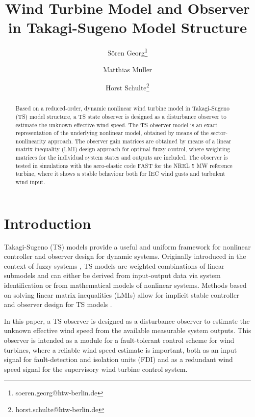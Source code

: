 \documentclass[a4paper]{article}
\title{Wind Turbine Model and Observer in Takagi-Sugeno Model Structure}
\date{}
\author[1]{S\"oren Georg\thanks{soeren.georg@htw-berlin.de}}
\author[1,2]{Matthias M\"uller}
\author[1]{Horst Schulte\thanks{horst.schulte@htw-berlin.de}}
\affil[1]{HTW Berlin, Department of Engineering I, Control Engineering, Berlin, Germany}
\affil[2]{Key Wind Energy GmbH, Berlin, Germany}
\begin{document}
\maketitle

\thispagestyle{fancy}

\begin{abstract}
Based on a reduced-order, dynamic nonlinear wind turbine model in Takagi-Sugeno (TS) model structure, a TS state observer is designed as a disturbance observer to estimate the unknown effective wind speed. The TS observer model is an exact representation of the underlying nonlinear model, obtained by means of the sector-nonlinearity approach. The observer gain matrices are obtained by means of a linear matrix inequality (LMI) design approach for optimal fuzzy control, where weighting matrices for the individual system states and outputs are included.
The observer is tested in simulations with the aero-elastic code FAST for the NREL 5 MW reference turbine, where it shows a stable behaviour both for IEC wind gusts and turbulent wind input.
\end{abstract}

\section{Introduction}

Takagi-Sugeno (TS) models provide a useful and uniform framework for nonlinear controller and observer design for dynamic systems. Originally introduced in the context of fuzzy systems \cite{TakagiSugeno}, TS models are weighted combinations of linear submodels and can either be derived from input-output data via system identification \cite{TakagiSugeno, SugenoKang:1988} or from mathematical models of nonlinear systems. Methods based on solving linear matrix inequalities (LMIs) allow for implicit stable controller and observer design for TS models \cite{WangTanakaGriffin:1996, Tanaka:2001, Lendek:2010}.

In this paper, a TS observer is designed as a disturbance observer to estimate the unknown effective wind speed from the available measurable system outputs. This observer is intended as a module for a fault-tolerant control scheme for wind turbines, where a reliable wind speed estimate is important, both as an input signal for fault-detection and isolation units (FDI) and as a redundant wind speed signal for the supervisory wind turbine control system.
\end{document}
